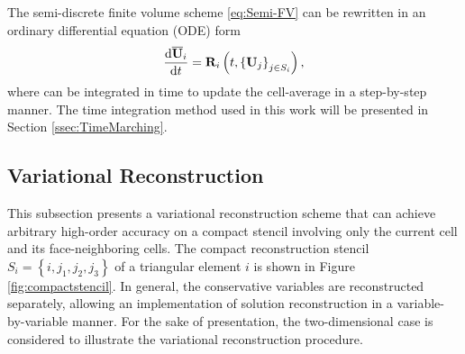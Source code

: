 
The semi-discrete finite volume scheme \eqref{eq:Semi-FV} can be rewritten in an ordinary differential equation (ODE) form
\begin{equation}
	\label{eq:FVODECell}
	\derivative{\uu_i}{t} = \R_i \left(t, \left\{\U_j\right\}_{j \in S_i} \right),
\end{equation}
where can be integrated in time to update the cell-average in a step-by-step manner. The time integration method used in this work will be presented in Section \ref{ssec:TimeMarching}. 

\subsection{Variational Reconstruction}
\label{ssec:VR}

This subsection presents a variational reconstruction scheme \cite{wang2017compact_VR} that can achieve arbitrary high-order accuracy on a compact stencil involving only the current cell and its face-neighboring cells. The compact reconstruction stencil $S_i= \left\{i,j_1,j_2,j_3\right\}$ of a triangular element $i$ is shown in Figure \ref{fig:compactstencil}. In general, the conservative variables are reconstructed separately, allowing an implementation of solution reconstruction in a variable-by-variable manner. For the sake of presentation, the two-dimensional case is considered to illustrate the variational reconstruction procedure.

